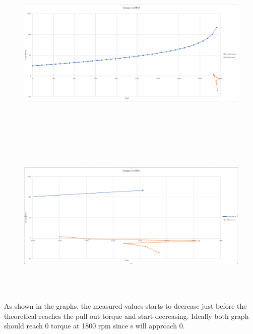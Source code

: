 \documentclass{article}
\begin{document}
    \begin{figure}[H]
        \centering
        \includegraphics[width=12cm, height = 8cm]{figures/rpm_torque.PNG}
        \label{fig:rpm_torque}
    \end{figure}

    \begin{figure}[H]
        \centering
        \includegraphics[width=12cm, height = 8cm]{figures/rpm_torque_zoom_in.PNG}
        \label{fig:rpm_torque_zin}
    \end{figure}

    As shown in the graphs, the measured values starts to decrease just before the theoretical 
    reaches the pull out torque and start decreasing. Ideally both graph should reach 0 torque at 1800 rpm 
    since s will approach 0.




    
    

            
        


        
\end{document}
